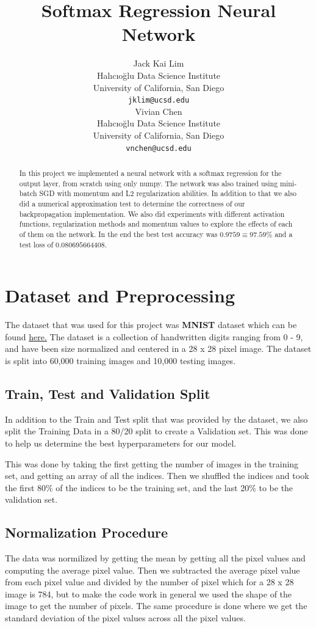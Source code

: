 \documentclass{article}
\title{Softmax Regression Neural Network}
\author{
  Jack Kai Lim\\
  Halıcıoğlu Data Science Institute\\
  University of California, San Diego\\
  \texttt{jklim@ucsd.edu}\\
  \And
  Vivian Chen\\
  Halıcıoğlu Data Science Institute\\
  University of California, San Diego\\
  \texttt{vnchen@ucsd.edu}\\
}
\begin{document}
\maketitle


\begin{abstract}
  In this project we implemented a neural network with a softmax regression for the output
  layer, from scratch using only numpy. The network was also trained using mini-batch SGD
  with momentum and L2 regularization abilities. In addition to that we also did a 
  numerical approximation test to determine the correctness of our backpropagation
  implementation. We also did experiments with different activation functions, regularization
  methods and momentum values to explore the effects of each of them on the network.
  In the end the best test accuracy was $0.9759 \equiv 97.59\%$ and a test loss of $0.080695664408$.
\end{abstract}


\section{Dataset and Preprocessing}
The dataset that was used for this project was \textbf{MNIST} dataset which can be found
\href{https://paperswithcode.com/dataset/mnist}{here.} The dataset is a collection of 
handwritten digits ranging from 0 - 9, and have been size normalized and centered in a
28 x 28 pixel image. The dataset is split into 60,000 training images and 10,000 testing
images. 

\subsection{Train, Test and Validation Split}
In addition to the Train and Test split that was provided by the dataset, we also split the 
Training Data in a 80/20 split to create a Validation set. This was done to help us 
determine the best hyperparameters for our model.

This was done by taking the first getting the number of images in the training set, and
getting an array of all the indices. Then we shuffled the indices and took the first 80\%
of the indices to be the training set, and the last 20\% to be the validation set.

\subsection{Normalization Procedure}
The data was normilized by getting the mean by getting all the pixel
values and computing the average pixel value. Then we subtracted the average pixel value
from each pixel value and divided by the number of pixel which for a 28 x 28 image is 784, but to 
make the code work in general we used the shape of the image to get the number of pixels. The same 
procedure is done where we get the standard deviation of the pixel values across all the pixel values.
\end{document}
